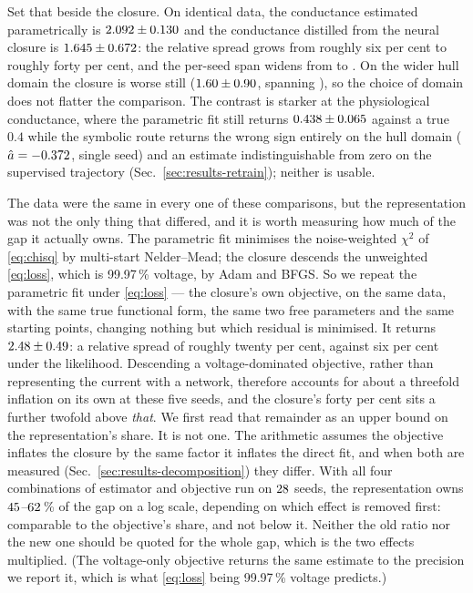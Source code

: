 \documentclass{article}
\newcommand{\gcaPhys}{0.4}     %
\newcommand{\LossShareV}{99.97}
\begin{document}
Set that beside the closure. On identical data, the conductance estimated
parametrically is $2.092 \pm 0.130$ and the conductance distilled
from the neural closure is $1.645 \pm 0.672$: the relative
spread grows from roughly six per cent to roughly forty per cent, and
the per-seed span widens from \valParamFitGcaHatRangeTwo{} to
\valSymbolicAHatRangeTrajTrain. On the wider hull domain the closure is worse
still ($1.60 \pm 0.90$, spanning \valSymbolicAHatRange), so the choice
of domain does not flatter the comparison. The contrast is
starker at the physiological conductance, where the parametric fit still returns
$0.438 \pm 0.065$ against a true $\gcaPhys$ while the symbolic
route returns the wrong sign entirely on the hull domain
($\hat a = -0.372$, single seed) and an estimate
indistinguishable from zero on the supervised trajectory
(Sec.~\ref{sec:results-retrain}); neither is usable.

The data were the same in every one of these comparisons, but the representation
was not the only thing that differed, and it is worth measuring how much of the
gap it actually owns. The parametric fit minimises the noise-weighted $\chi^2$ of
\eqref{eq:chisq} by multi-start Nelder--Mead; the closure descends the unweighted
\eqref{eq:loss}, which is \LossShareV\,\% voltage, by Adam and BFGS. So we repeat
the parametric fit under \eqref{eq:loss} --- the closure's own objective, on the
same data, with the same true functional form, the same two free parameters and
the same starting points, changing nothing but which residual is minimised. It
returns $2.48 \pm 0.49$: a relative spread of roughly
twenty per cent, against six per cent under the likelihood. Descending a
voltage-dominated objective, rather than representing the current with a network,
therefore accounts for about a threefold inflation on its own at these five
seeds, and the closure's forty per cent sits a further twofold above
\emph{that}.
We first read that remainder as an upper bound on the representation's share. It
is not one. The arithmetic assumes the objective inflates the closure by the same
factor it inflates the direct fit, and when both are measured
(Sec.~\ref{sec:results-decomposition}) they differ. With all four combinations of
estimator and objective run on $28$ seeds, the representation owns
$45$--$62$\,\% of the gap on a log scale,
depending on which effect is removed first: comparable to the objective's share,
and not below it. Neither the old ratio nor the new one should be quoted for the
whole gap, which is the two effects multiplied. (The voltage-only objective
returns the same estimate to the precision we report it, which is what
\eqref{eq:loss} being \LossShareV\,\% voltage predicts.)
\end{document}
